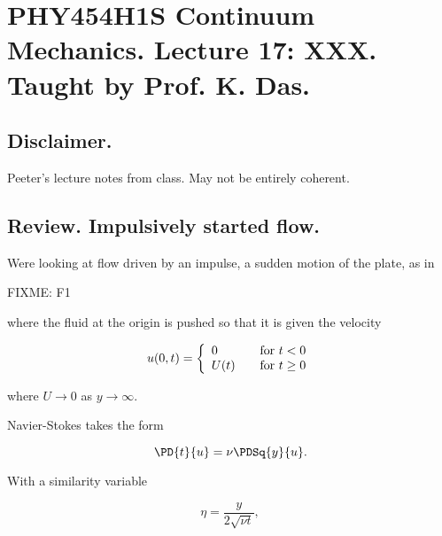 
%

\chapter{PHY454H1S Continuum Mechanics.  Lecture 17: XXX.  Taught by Prof. K. Das.}
\label{chap:continuumL17}
{}
\date{Mar 16, 2012}

\beginArtWithToc

\section{Disclaimer.}

Peeter's lecture notes from class.  May not be entirely coherent.

\section{Review.  Impulsively started flow.}

Were looking at flow driven by an impulse, a sudden motion of the plate, as in

FIXME: F1

where the fluid at the origin is pushed so that it is given the velocity

\begin{equation}\label{eqn:continuumL17:n}
u(0, t) = 
\left\{
\begin{array}{l l}
0 & \quad \mbox{for $t < 0$} \\
U(t) & \quad \mbox{for $t \ge 0$} \\
\end{array}
\right.
\end{equation}

where $U \rightarrow 0$ as $y \rightarrow \infty$.

Navier-Stokes takes the form

\begin{equation}\label{eqn:continuumL17:n}
\PD{t}{u} = \nu \PDSq{y}{u}.
\end{equation}

With a similarity variable

\begin{equation}\label{eqn:continuumL17:n}
\eta = \frac{y}{2 \sqrt{\nu t}},
\end{equation}


